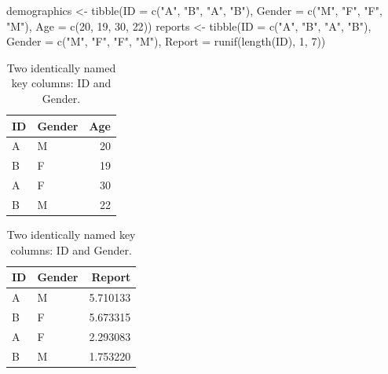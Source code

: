 \documentclass[
]{book}
\newenvironment{Shaded}{\begin{snugshade}}{\end{snugshade}}
\newcommand{\AttributeTok}[1]{\textcolor[rgb]{0.77,0.63,0.00}{#1}}
\newcommand{\DecValTok}[1]{\textcolor[rgb]{0.00,0.00,0.81}{#1}}
\newcommand{\FunctionTok}[1]{\textcolor[rgb]{0.00,0.00,0.00}{#1}}
\newcommand{\NormalTok}[1]{#1}
\newcommand{\OtherTok}[1]{\textcolor[rgb]{0.56,0.35,0.01}{#1}}
\newcommand{\StringTok}[1]{\textcolor[rgb]{0.31,0.60,0.02}{#1}}
\begin{document}
\begin{Shaded}
\begin{Highlighting}[]
\NormalTok{demographics }\OtherTok{\textless{}{-}} \FunctionTok{tibble}\NormalTok{(}\AttributeTok{ID =} \FunctionTok{c}\NormalTok{(}\StringTok{"A"}\NormalTok{, }\StringTok{"B"}\NormalTok{, }\StringTok{"A"}\NormalTok{, }\StringTok{"B"}\NormalTok{),}
                       \AttributeTok{Gender =} \FunctionTok{c}\NormalTok{(}\StringTok{"M"}\NormalTok{, }\StringTok{"F"}\NormalTok{, }\StringTok{"F"}\NormalTok{, }\StringTok{"M"}\NormalTok{),}
                       \AttributeTok{Age =} \FunctionTok{c}\NormalTok{(}\DecValTok{20}\NormalTok{, }\DecValTok{19}\NormalTok{, }\DecValTok{30}\NormalTok{, }\DecValTok{22}\NormalTok{))}
\NormalTok{reports }\OtherTok{\textless{}{-}} \FunctionTok{tibble}\NormalTok{(}\AttributeTok{ID =} \FunctionTok{c}\NormalTok{(}\StringTok{"A"}\NormalTok{, }\StringTok{"B"}\NormalTok{, }\StringTok{"A"}\NormalTok{, }\StringTok{"B"}\NormalTok{),}
                  \AttributeTok{Gender =} \FunctionTok{c}\NormalTok{(}\StringTok{"M"}\NormalTok{, }\StringTok{"F"}\NormalTok{, }\StringTok{"F"}\NormalTok{, }\StringTok{"M"}\NormalTok{),}
                  \AttributeTok{Report =} \FunctionTok{runif}\NormalTok{(}\FunctionTok{length}\NormalTok{(ID), }\DecValTok{1}\NormalTok{, }\DecValTok{7}\NormalTok{))}
\end{Highlighting}
\end{Shaded}

\begin{table}
\caption{\label{tab:unnamed-chunk-197}Two identically named key columns: ID and Gender.}

\centering
\begin{tabular}[t]{l|l|r}
\hline
ID & Gender & Age\\
\hline
A & M & 20\\
\hline
B & F & 19\\
\hline
A & F & 30\\
\hline
B & M & 22\\
\hline
\end{tabular}
\centering
\begin{tabular}[t]{l|l|r}
\hline
ID & Gender & Report\\
\hline
A & M & 5.710133\\
\hline
B & F & 5.673315\\
\hline
A & F & 2.293083\\
\hline
B & M & 1.753220\\
\hline
\end{tabular}
\end{table}
\end{document}
